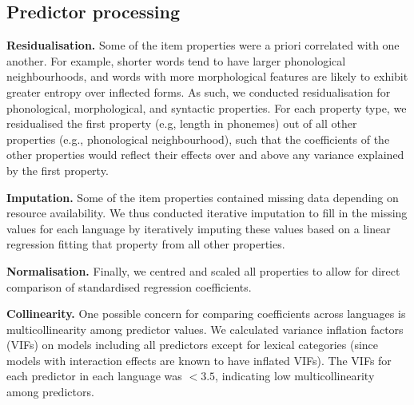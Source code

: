 \documentclass[10pt, letterpaper]{article}
\begin{document}
\hypertarget{predictor-processing}{%
\subsection{Predictor processing}\label{predictor-processing}}

\textbf{Residualisation.} Some of the item properties were a priori
correlated with one another. For example, shorter words tend to have
larger phonological neighbourhoods, and words with more morphological
features are likely to exhibit greater entropy over inflected forms. As
such, we conducted residualisation for phonological, morphological, and
syntactic properties. For each property type, we residualised the first
property (e.g, length in phonemes) out of all other properties (e.g.,
phonological neighbourhood), such that the coefficients of the other
properties would reflect their effects over and above any variance
explained by the first property.

\textbf{Imputation.} Some of the item properties contained missing data
depending on resource availability. We thus conducted iterative
imputation to fill in the missing values for each language by
iteratively imputing these values based on a linear regression fitting
that property from all other properties.

\textbf{Normalisation.} Finally, we centred and scaled all properties to
allow for direct comparison of standardised regression coefficients.

\textbf{Collinearity.} One possible concern for comparing coefficients
across languages is multicollinearity among predictor values. We
calculated variance inflation factors (VIFs) on models including all
predictors except for lexical categories (since models with interaction
effects are known to have inflated VIFs). The VIFs for each predictor in
each language was \(<3.5\), indicating low multicollinearity among
predictors.
\end{document}
